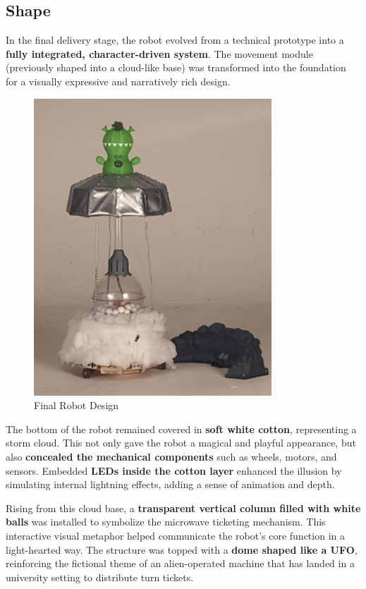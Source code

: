 \subsection{Shape}

In the final delivery stage, the robot evolved from a technical prototype into a \textbf{fully integrated, character-driven system}. The movement module (previously shaped into a cloud-like base) was transformed into the foundation for a visually expressive and narratively rich design.

\begin{figure}[H]
    \centering
    \includegraphics[width=0.6\linewidth]{../ReportMovementModule/images/Aspose.Words.728084da-df58-4b9d-a372-f65cffbdb23d.029.jpeg}
    \caption{Final Robot Design}
\end{figure}

The bottom of the robot remained covered in \textbf{soft white cotton}, representing a storm cloud. This not only gave the robot a magical and playful appearance, but also \textbf{concealed the mechanical components} such as wheels, motors, and sensors. Embedded \textbf{LEDs inside the cotton layer} enhanced the illusion by simulating internal lightning effects, adding a sense of animation and depth.

Rising from this cloud base, a \textbf{transparent vertical column filled with white balls} was installed to symbolize the microwave ticketing mechanism. This interactive visual metaphor helped communicate the robot's core function in a light-hearted way. The structure was topped with a \textbf{dome shaped like a UFO}, reinforcing the fictional theme of an alien-operated machine that has landed in a university setting to distribute turn tickets.


